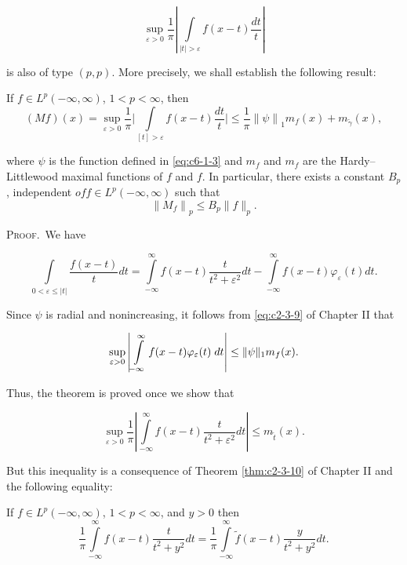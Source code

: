 \[
\sup_{\varepsilon>0}\frac{1}{\pi}\left|\int\limits_{|t|>\varepsilon}f(x-t)\frac{d t}{t}\right|
\]

is also of type $(p, p)$. More precisely, we shall establish the following result:

\begin{theorem}
\label{thm:c6-1-4}
If $f \in L^p(-\infty, \infty)$, $1 < p < \infty$, then
\[
(M f)(x)=\sup_{\varepsilon>0}\frac{1}{\pi}\Bigg|\int\limits_{[t]>\varepsilon}f(x-t)\frac{d t}{t}\Bigg|\leq\frac{1}{\pi}\left\|\psi\right\|_{1}m_{f}(x)+m_{\widetilde{\gamma}}(x),
\]

where $\psi$ is the function defined in \eqref{eq:c6-1-3} and $m_f$ and $m_f$ are the Hardy--Littlewood maximal functions of $f$ and $f$. In particular, there exists a constant $B_p$, independent $of f \in L^p(-\infty, \infty)$ such that
\[
\left\|M_{f}\right\|_{p}\leq B_{p}\|f\|_{p}.
\]

\end{theorem}

\textsc{Proof.}\ We have

\[
\int\limits_{0<\varepsilon\leq|t|}\frac{f(x-t)}{t}dt=\int\limits_{-\infty}^{\infty}f(x-t)\frac{t}{t^{2}+\varepsilon^{2}}dt-\int\limits_{-\infty}^{\infty}f(x-t)\varphi_{\varepsilon}(t)dt.
\]

Since $\psi$ is radial and nonincreasing, it follows from \eqref{eq:c2-3-9} of Chapter II that

\[
\sup_{\varepsilon>0}\left|\intop_{-\infty}^{\infty}f(x-t)\varphi_{\varepsilon}(t)\;d t\right|\leq\|\psi\|_{1}m_{f}(x).
\]

Thus, the theorem is proved once we show that

\[
\sup_{\varepsilon>0}\frac{1}{\pi}\left|\int\limits_{-\infty}^{\infty}f(x-t)\frac{t}{t^{2}+\varepsilon^{2}}dt\right|\leq m_{\widetilde{t}}(x).
\]

But this inequality is a consequence of Theorem \ref{thm:c2-3-10} of Chapter II and the following equality:

\begin{lemma}
\label{lem:c6-1-5}
If $f \in L^p(-\infty, \infty)$, $1 < p < \infty$, and $y > 0$ then
\[
\frac{1}{\pi}\int\limits_{-\infty}^{\infty}f(x-t)\frac{t}{t^{2}+y^{2}}dt=\frac{1}{\pi}\int\limits_{-\infty}^{\infty}\tilde{f}(x-t)\frac{y}{t^{2}+y^{2}}dt.
\]

\end{lemma}

